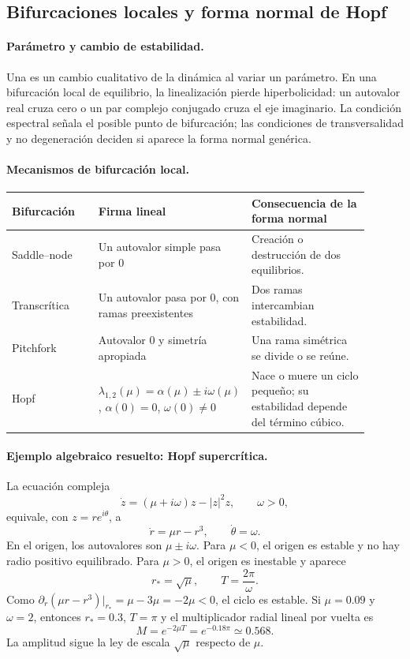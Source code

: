 \subsection{Bifurcaciones locales y forma normal de Hopf}

\paragraph{Parámetro y cambio de estabilidad.}
Una  es un cambio cualitativo de la dinámica al variar un
parámetro. En una bifurcación local de equilibrio, la linealización pierde
hiperbolicidad: un autovalor real cruza cero o un par complejo conjugado cruza el eje
imaginario. La condición espectral señala el posible punto de bifurcación; las condiciones de
transversalidad y no degeneración deciden si aparece la forma normal genérica.

\paragraph{Mecanismos de bifurcación local.}
\begin{longtable}{>{\raggedright\arraybackslash}p{0.25\linewidth}
                  >{\raggedright\arraybackslash}p{0.30\linewidth}
                  >{\raggedright\arraybackslash}p{0.35\linewidth}}
\toprule
Bifurcación & Firma lineal & Consecuencia de la forma normal \\
\midrule
\endhead
Saddle--node & Un autovalor simple pasa por \(0\) &
Creación o destrucción de dos equilibrios.\\
Transcrítica & Un autovalor pasa por \(0\), con ramas preexistentes &
Dos ramas intercambian estabilidad.\\
Pitchfork & Autovalor \(0\) y simetría apropiada &
Una rama simétrica se divide o se reúne.\\
Hopf & \(\lambda_{1,2}(\mu)=\alpha(\mu)\pm i\omega(\mu)\),
\(\alpha(0)=0\), \(\omega(0)\ne0\) &
Nace o muere un ciclo pequeño; su estabilidad depende del término cúbico.\\
\bottomrule
\end{longtable}

\paragraph{Ejemplo algebraico resuelto: Hopf supercrítica.}
La ecuación compleja
\[
 \dot z=(\mu+i\omega)z-|z|^2z,\qquad \omega>0,
\]
equivale, con \(z=re^{i\theta}\), a
\[
 \dot r=\mu r-r^3,\qquad \dot\theta=\omega.
\]
En el origen, los autovalores son \(\mu\pm i\omega\). Para \(\mu<0\), el origen es
estable y no hay radio positivo equilibrado. Para \(\mu>0\), el origen es inestable
y aparece
\[
 r_*=\sqrt{\mu},\qquad T=\frac{2\pi}{\omega}.
\]
Como \(\partial_r(\mu r-r^3)|_{r_*}=\mu-3\mu=-2\mu<0\), el ciclo es estable. Si
\(\mu=0.09\) y \(\omega=2\), entonces \(r_*=0.3\), \(T=\pi\) y el multiplicador
radial lineal por vuelta es
\[
 M=e^{-2\mu T}=e^{-0.18\pi}\simeq0.568.
\]
La amplitud sigue la ley de escala \(\sqrt\mu\) respecto de \(\mu\).

